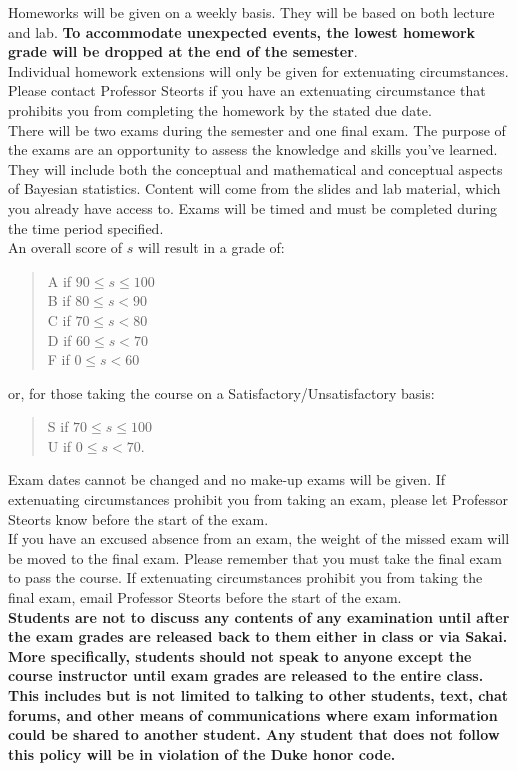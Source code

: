 \documentclass[11pt]{article}
\begin{document}
Homeworks will be given on a weekly basis. They will be based on both lecture and lab. \textbf{To accommodate unexpected events, the lowest homework grade will be dropped at the end of the semester}.\\

Individual homework extensions will only be given for extenuating circumstances. Please contact Professor Steorts if you have an extenuating circumstance that prohibits you from completing the homework by the stated due date.\\

There will be two exams during the semester and one final exam. The purpose of the exams are an opportunity to assess the knowledge and skills you’ve learned. They will include both the conceptual and mathematical and conceptual aspects of Bayesian statistics. Content will come from the slides and lab material, which you already have access to. Exams will be timed and must be completed during the time period specified. \\

An overall score of $s$ will result in a grade of:
\begin{quote}
A if $90\leq s\leq 100$ \\
B if $80\leq s < 90$ \\
C if $70\leq s < 80$ \\
D if $60\leq s < 70$ \\
F if $0\leq s < 60$
\end{quote}
or, for those taking the course on a Satisfactory/Unsatisfactory basis:
\begin{quote}
S if $70\leq s\leq 100$ \\
U if $0\leq s < 70$.
\end{quote}


Exam dates cannot be changed and no make-up exams will be given. If extenuating circumstances prohibit you from taking an exam, please let Professor Steorts know before the start of the exam.\\

If you have an excused absence from an exam, the weight of the missed exam will be moved to the final exam. Please remember that you must take the final exam to pass the course. If extenuating circumstances prohibit you from taking the final exam, email Professor Steorts before the start of the exam. \\

\textbf{Students are not to discuss any contents of any examination until after the exam grades are released back to them either in class or via Sakai. More specifically, students should not speak to anyone except the course instructor until exam grades are released to the entire class. This includes but is not limited to talking to other students, text, chat forums, and other means of communications where exam information could be shared to another student. Any student that does not follow this policy will be in violation of the Duke honor code.}\\
\end{document}
